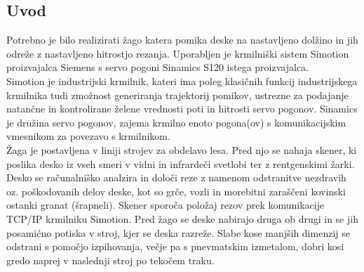 \documentclass[a4paper,twoside,openright,12pt]{book}
\begin{document}
{\subsection{Uvod}
Potrebno je bilo realizirati žago katera pomika deske na nastavljeno dolžino in jih odreže z nastavljeno hitrostjo rezanja. Uporabljen je krmilniški sistem Simotion proizvajalca Siemens s servo pogoni Sinamics S120 istega proizvajalca.\\
Simotion je industrijski krmilnik, kateri ima poleg klasičnih funkcij industrijskega krmilnika tudi zmožnost generiranja trajektorij pomikov, ustrezne za podajanje natančne in kontrolirane želene vrednosti poti in hitrosti servo pogonov. Sinamics je družina servo pogonov, zajema krmilno enoto pogona(ov) s komunikacijskim vmesnikom za povezavo s krmilnikom.\\
Žaga je postavljena v liniji strojev za obdelavo lesa. Pred njo se nahaja skener, ki poslika desko iz vseh smeri v vidni in infrardeči svetlobi ter z rentgenskimi žarki. Desko se računalniško analzira in določi reze z namenom odstranitve nezdravih oz. poškodovanih delov deske, kot so grče, vozli in morebitni zaraščeni kovinski ostanki granat (šrapneli). Skener sporoča položaj rezov prek komunikacije TCP/IP krmilniku Simotion. Pred žago se deske nabirajo druga ob drugi in se jih posamićno potiska v stroj, kjer se deska razreže. Slabe kose manjših dimenzij se odstrani s pomočjo izpihovanja, večje pa  s pnevmatskim izmetalom, dobri kosi gredo naprej v naslednji stroj po tekočem traku.

\begin{figure}[h]
	\centering
\end{figure}}
\end{document}
